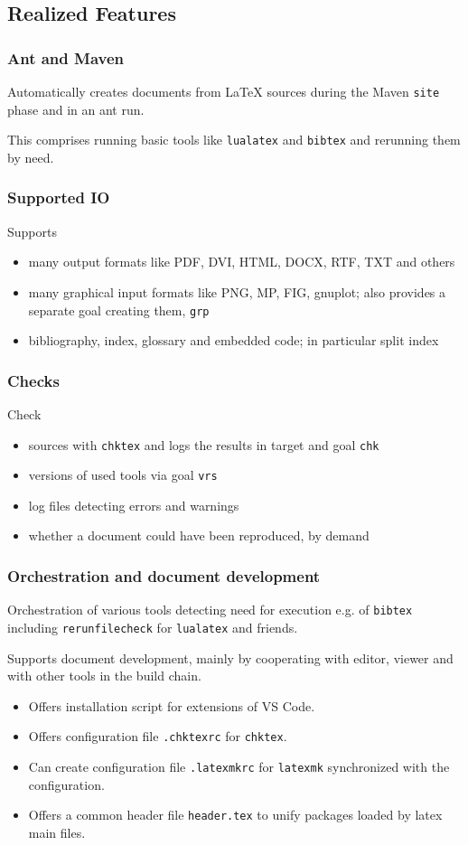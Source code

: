 \subsection{Realized Features}

\begin{frame}
  \frametitle{Ant and Maven}
  Automatically creates documents from LaTeX sources during the Maven \texttt{site} phase 
  and in an ant run. 

  This comprises running basic tools like \texttt{lualatex} and \texttt{bibtex} 
  and rerunning them by need. 

\end{frame}

\begin{frame}
  \frametitle{Supported IO}
  Supports 
  \begin{itemize}
    \item
    many output formats like PDF, DVI, HTML, DOCX, RTF, TXT and others
    \item
    many graphical input formats like PNG, MP, FIG, gnuplot; 
    also provides a separate goal creating them, \texttt{grp} 
    \item
    bibliography, index, glossary and embedded code; in particular split index
  \end{itemize}
\end{frame}


\begin{frame}
  \frametitle{Checks}
  Check 
  \begin{itemize}
    \item
    sources with \texttt{chktex} and logs the results in target and goal \texttt{chk} 
    \item
    versions of used tools via goal \texttt{vrs} 
    \item
    log files detecting errors and warnings 
    \item
    whether a document could have been reproduced, by demand 
  \end{itemize}
\end{frame}

\begin{frame}
  \frametitle{Orchestration and document development}
  Orchestration of various tools detecting need for execution e.g.
  of \texttt{bibtex} including \texttt{rerunfilecheck} for \texttt{lualatex} and friends.

  Supports document development, mainly by cooperating with editor, viewer and with other tools in the build chain.
  \begin{itemize}
    \item Offers installation script for extensions of VS Code.
    \item Offers configuration file \texttt{.chktexrc} for \texttt{chktex}.
    \item Can create configuration file \texttt{.latexmkrc} 
    for \texttt{latexmk} synchronized with the configuration.
    \item Offers a common header file \texttt{header.tex} 
    to unify packages loaded by latex main files.
  \end{itemize}
\end{frame}


